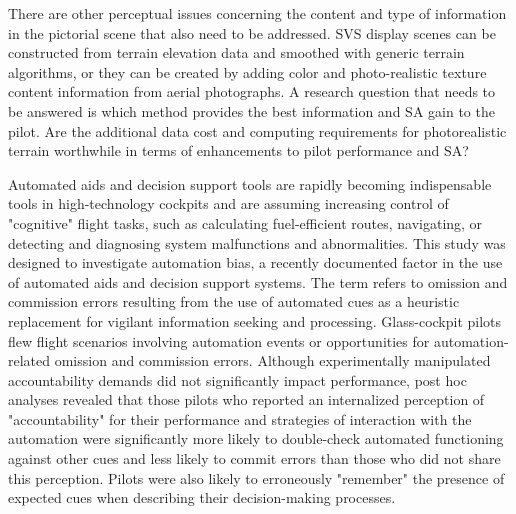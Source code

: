 \documentclass[utf8,bachelor,manualbib]{gradu3}
\begin{document}
There are other perceptual issues concerning the content and type of information
in the pictorial scene that also need to be addressed. SVS display scenes can
be constructed from terrain elevation data and smoothed with generic terrain algorithms,
or they can be created by adding color and photo-realistic texture content
information from aerial photographs. A research question that needs to be
answered is which method provides the best information and SA gain to the pilot.
Are the additional data cost and computing requirements for photorealistic
terrain worthwhile in terms of enhancements to pilot performance and SA? \citep{prinzel2004}

Automated aids and decision support tools are rapidly becoming indispensable tools
in high-technology cockpits and are assuming increasing control of "cognitive" flight
tasks, such as calculating fuel-efficient routes, navigating, or detecting and diagnosing
system malfunctions and abnormalities. This study was designed to investigate
automation bias, a recently documented factor in the use of automated aids and
decision support systems. The term refers to omission and commission errors resulting
from the use of automated cues as a heuristic replacement for vigilant information
seeking and processing. Glass-cockpit pilots flew flight scenarios involving automation
events or opportunities for automation-related omission and commission errors.
Although experimentally manipulated accountability demands did not significantly
impact performance, post hoc analyses revealed that those pilots who reported an
internalized perception of "accountability" for their performance and strategies of
interaction with the automation were significantly more likely to double-check
automated functioning against other cues and less likely to commit errors than those
who did not share this perception. Pilots were also likely to erroneously "remember"
the presence of expected cues when describing their decision-making processes. \citep{mosier1998}
\end{document}
